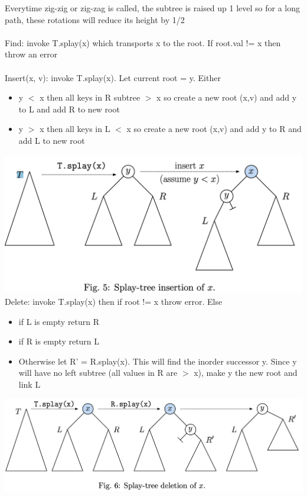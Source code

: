 \documentclass{article}
\begin{document}
  Everytime zig-zig or zig-zag is called, the subtree is raised up 1 level so for a long path, these rotations will reduce its height by 1/2\\ \\
  Find: invoke T.splay(x) which transports x to the root. If root.val != x then throw an error\\ \\
  Insert(x, v): invoke T.splay(x). Let current root = y. Either
  \begin{itemize}[noitemsep]
  \item y $<$ x then all keys in R subtree $>$ x so create a new root (x,v) and add y to L and add R to new root
  \item y $>$ x then all keys in L $<$ x so create a new root (x,v) and add y to R and add L to new root
  \end{itemize}
  \includegraphics[width=\textwidth]{SplayInsert}
  Delete: invoke T.splay(x) then if root != x throw error. Else 
  \begin{itemize}[noitemsep]
  \item if L is empty return R
  \item if R is empty return L 
  \item Otherwise let R' = R.splay(x). This will find the inorder successor y. Since y will have no left subtree (all values in R are $>$ x), make y the new root and link L
  \end{itemize}
  \includegraphics[width=\textwidth]{SplayDelete}
  \newpage
\end{document}

